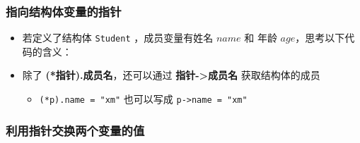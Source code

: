 \begin{frame}[fragile]
    \frametitle{指向结构体变量的指针}

    \begin{itemize}
        \item<1-> 若定义了结构体 \lstinline|Student| ，成员变量有姓名 $name$ 和 年龄 $age$，思考以下代码的含义：
        
        
        \item<2-> 除了 \textbf{(*指针).成员名}，还可以通过 \textbf{指针->成员名} 获取结构体的成员
        \begin{itemize}
            \item \lstinline|(*p).name = "xm"| 也可以写成 \lstinline|p->name = "xm"|
        \end{itemize}
    \end{itemize}
\end{frame}

\begin{frame}[fragile]
    \frametitle{利用指针交换两个变量的值}
    
\end{frame}


